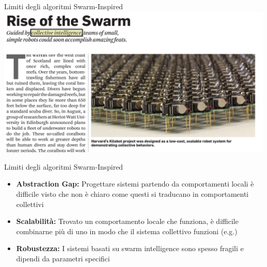 \documentclass[presentation, 10pt,aspectratio=169]{beamer}\mode<presentation>{\usetheme{AMSBolognaFC}}
\begin{document}
\begin{frame}{Limiti degli algoritmi Swarm-Inspired}
\includegraphics[width=\textwidth]{img/rise-of-swarm.png}
\end{frame}
\begin{frame}{Limiti degli algoritmi Swarm-Inspired}
	\begin{itemize}
		\item \textbf{Abstraction Gap:} Progettare sistemi partendo da comportamenti locali è difficile visto che non è chiaro come questi si traducano in comportamenti collettivi
		\item \textbf{Scalabilità:} Trovato un comportamento locale che funziona, è difficile combinarne più di uno in modo che il sistema collettivo funzioni (e.g.)
		\item \textbf{Robustezza:} I sistemi basati su swarm intelligence sono spesso fragili e dipendi da parametri specifici
	\end{itemize}
\end{frame}
\end{document}
